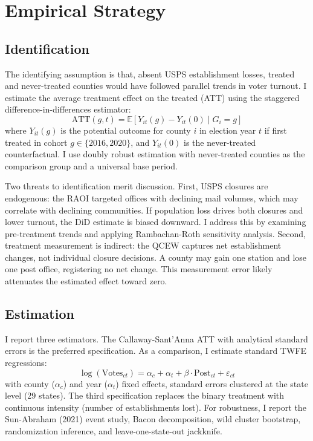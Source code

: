 \documentclass[12pt]{article}
\newcommand{\E}{\mathbb{E}}
\begin{document}
\section{Empirical Strategy}

\subsection{Identification}

The identifying assumption is that, absent USPS establishment losses, treated and never-treated counties would have followed parallel trends in voter turnout. I estimate the average treatment effect on the treated (ATT) using the \citet{callaway2021} staggered difference-in-differences estimator:
\begin{equation}
\text{ATT}(g,t) = \E\left[Y_{it}(g) - Y_{it}(0) \mid G_i = g\right]
\end{equation}
where $Y_{it}(g)$ is the potential outcome for county $i$ in election year $t$ if first treated in cohort $g \in \{2016, 2020\}$, and $Y_{it}(0)$ is the never-treated counterfactual. I use doubly robust estimation with never-treated counties as the comparison group and a universal base period.

Two threats to identification merit discussion. First, USPS closures are endogenous: the RAOI targeted offices with declining mail volumes, which may correlate with declining communities. If population loss drives both closures and lower turnout, the DiD estimate is biased downward. I address this by examining pre-treatment trends and applying Rambachan-Roth sensitivity analysis. Second, treatment measurement is indirect: the QCEW captures net establishment changes, not individual closure decisions. A county may gain one station and lose one post office, registering no net change. This measurement error likely attenuates the estimated effect toward zero.

\subsection{Estimation}

I report three estimators. The Callaway-Sant'Anna ATT with analytical standard errors is the preferred specification. As a comparison, I estimate standard TWFE regressions:
\begin{equation}
\log(\text{Votes}_{ct}) = \alpha_c + \alpha_t + \beta \cdot \text{Post}_{ct} + \varepsilon_{ct}
\end{equation}
with county ($\alpha_c$) and year ($\alpha_t$) fixed effects, standard errors clustered at the state level (29 states). The third specification replaces the binary treatment with continuous intensity (number of establishments lost). For robustness, I report the Sun-Abraham (2021) event study, Bacon decomposition, wild cluster bootstrap, randomization inference, and leave-one-state-out jackknife.
\end{document}
